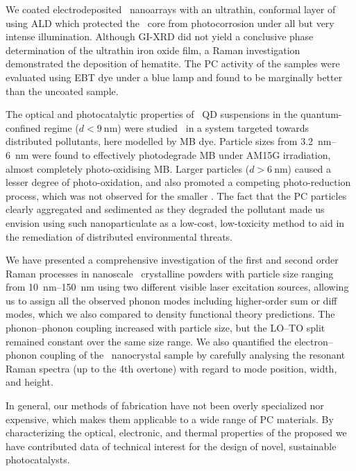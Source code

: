 \documentclass[draft,webedition,openright,titles,swedish,english]{LuaUUThesis}\usepackage[]{graphicx}\usepackage[]{xcolor}
\begin{document}
We coated electrodeposited \ZnO\ nanoarrays with an ultrathin, conformal
layer of  using \gls{ALD} which protected the \ZnO\ core from
photocorrosion under all but very intense illumination.
Although \gls{GI-XRD} did not yield a conclusive phase determination of the ultrathin
iron oxide film, a Raman investigation demonstrated the deposition of hematite.
The \gls{PC} activity of the samples were evaluated using \gls{EBT} dye
under a blue lamp and found to be marginally better than the uncoated sample.


The optical and photocatalytic properties of \ZnO\ \gls{QD} suspensions in the
quantum-confined regime ($d<\qty{9}{\nm}$) were studied \insitu\ in a system
targeted towards distributed pollutants, here modelled by \gls{MB} dye.
Particle sizes from \qtyrange{3.2}{6}{\nm} were found to effectively
photodegrade \gls{MB} under \gls{AM15G} irradiation, almost
completely photo-oxidising \gls{MB}.
Larger particles ($d>\qty{6}{\nm}$) caused a lesser degree of photo-oxidation,
and also promoted a competing photo-reduction process, which was not observed
for the smaller .
The fact that the \gls{PC} particles clearly aggregated and sedimented as they
degraded the pollutant made us envision using such nanoparticulate 
as a low-cost, low-toxicity method to aid in the remediation of
distributed environmental threats.


We have presented a comprehensive investigation of the first and second order Raman processes
in nanoscale \ZnO\ crystalline powders with particle size ranging from \qtyrange{10}{150}{\nm}
using two different visible laser excitation sources, allowing us to assign all the observed
phonon modes including higher-order sum or diff modes, which we also compared
to density functional theory predictions.
The phonon--phonon coupling increased with particle size, but the LO--TO split
remained constant over the same size range.
We also quantified the electron--phonon coupling of the \ZnO\ nanocrystal sample
by carefully analysing the resonant Raman spectra (up to the 4th overtone) with
regard to mode position, width, and height.



In general, our methods of fabrication have not been overly specialized nor expensive,
which makes them applicable to a wide range of \gls{PC} materials.
By characterizing the optical, electronic, and thermal properties of the
proposed  we have contributed data of technical interest for
the design of novel, sustainable photocatalysts.
\end{document}
